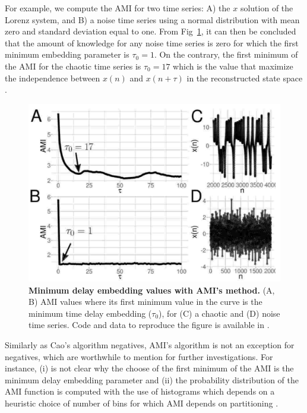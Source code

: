 \documentclass[fleqn,10pt]{wlscirep}
\begin{document}
For example, we compute the AMI for two time series:
A) the $x$ solution of the Lorenz system, and
B) a noise time series using a normal distribution with mean zero and 
standard deviation equal to one. From Fig~\ref{fig:amis}, it can then be 
concluded that the amount of knowledge for any noise time series is zero 
for which the first minimum embedding parameter is $\tau_0=1$. 
On the contrary, the first minimum of the AMI for the chaotic time series 
is $\tau_0=17$ which is the value that maximize the independence 
between $x(n)$ and $x(n+\tau)$ in the reconstructed state space 
\cite{bradley2015}.
\begin{figure}[ht]
\centering
\includegraphics[width=1.0\textwidth]{ami.pdf}
    \caption{
	{\bf Minimum delay embedding values with AMI's method.} 
    	(A, B) AMI values where its first minimum value in the curve
	is the minimum time delay embedding ($\tau_0$), 
	for (C) a chaotic and (D) noise time series.
	Code and data to reproduce the figure is available in \cite{srep2020}.
        }
    \label{fig:amis}
\end{figure}
Similarly as Cao's algorithm negatives, AMI's algorithm is not an
exception for negatives, which are worthwhile to mention for further 
investigations.
For instance, (i) is not clear why the choose of the first minimum of the AMI 
is the minimum delay embedding parameter \cite{kantz2003} and 
(ii) the probability distribution of the AMI function is computed
with the use of histograms which depends on a heuristic choice of number of bins
for which AMI depends on partitioning \cite{garcia2005e71}.
\end{document}
